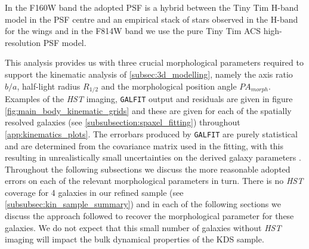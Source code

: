 \documentclass[fleqn,usenatbib]{mn2e}
\begin{document}
In the F160W band the adopted PSF is a hybrid between the Tiny Tim H-band model \citep{Krist2011} in the PSF centre and an empirical stack of stars observed in the H-band for the wings \citep{VanderWel2012} and in the F814W band we use the pure Tiny Tim ACS high-resolution PSF model.

This analysis provides us with three crucial morphological parameters required to support the kinematic analysis of \cref{subsec:3d_modelling}, namely the axis ratio $b/a$, half-light radius $R_{1/2}$ and the morphological position angle $PA_{morph}$.
Examples of the {\em HST} imaging, {\tt GALFIT} output and residuals are given in figure \ref{fig:main_body_kinematic_grids} and these are given for each of the spatially resolved galaxies (see \cref{subsubsection:spaxel_fitting}) throughout \cref{app:kinematics_plots}. 
The errorbars produced by {\tt GALFIT} are purely statistical and are determined from the covariance matrix used in the fitting, with this resulting in unrealistically small uncertainties on the derived galaxy parameters \citep{Hausler2007,Bruce2012}.
Throughout the following subsections we discuss the more reasonable adopted errors on each of the relevant morphological parameters in turn.
There is no {\em HST} coverage for 4 galaxies in our refined sample (see \cref{subsubsec:kin_sample_summary}) and in each of the following sections we discuss the approach followed to recover the morphological parameter for these galaxies.
We do not expect that this small number of galaxies without {\em HST} imaging will impact the bulk dynamical properties of the KDS sample.
\end{document}
